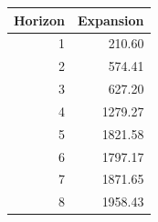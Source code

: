 \begin{tabular}{rr}
\toprule
Horizon & Expansion \\
\midrule
1 & 210.60 \\
2 & 574.41 \\
3 & 627.20 \\
4 & 1279.27 \\
5 & 1821.58 \\
6 & 1797.17 \\
7 & 1871.65 \\
8 & 1958.43 \\
\bottomrule
\end{tabular}
